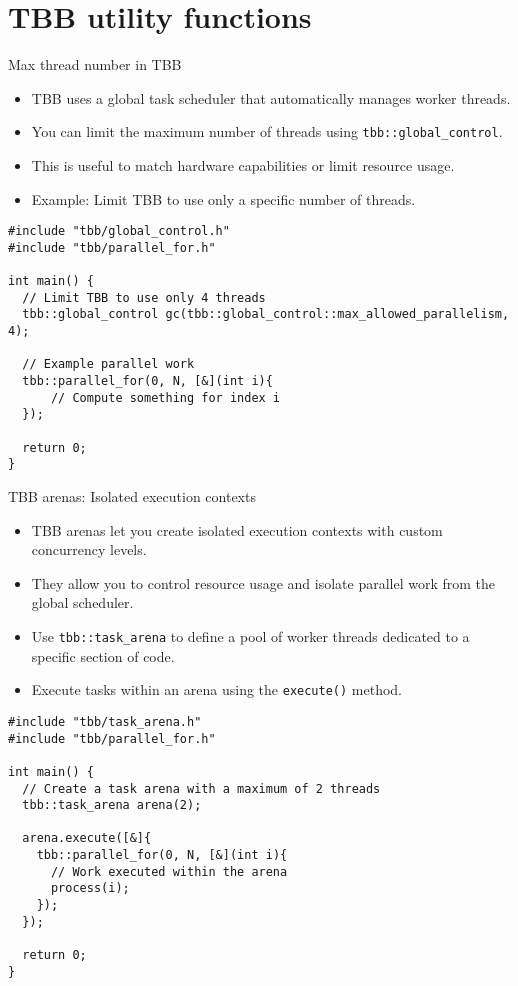 \documentclass{beamer}
\begin{document}
\section{TBB utility functions}

\begin{frame}[fragile]{Max thread number in TBB}
  \begin{itemize}
    \item TBB uses a global task scheduler that automatically manages worker threads.
    \item You can limit the maximum number of threads using \texttt{tbb::global\_control}.
    \item This is useful to match hardware capabilities or limit resource usage.
    \item Example: Limit TBB to use only a specific number of threads.
  \end{itemize}

  \vspace{0.5em}

  \lstset{style=CStyle}
  \begin{lstlisting}
#include "tbb/global_control.h"
#include "tbb/parallel_for.h"

int main() {
  // Limit TBB to use only 4 threads
  tbb::global_control gc(tbb::global_control::max_allowed_parallelism, 4);

  // Example parallel work
  tbb::parallel_for(0, N, [&](int i){
      // Compute something for index i
  });

  return 0;
}
  \end{lstlisting}
\end{frame}

\begin{frame}[fragile]{TBB arenas: Isolated execution contexts}
  \begin{itemize}
    \item TBB arenas let you create isolated execution contexts with custom concurrency levels.
    \item They allow you to control resource usage and isolate parallel work from the global scheduler.
    \item Use \texttt{tbb::task\_arena} to define a pool of worker threads dedicated to a specific section of code.
    \item Execute tasks within an arena using the \texttt{execute()} method.
  \end{itemize}

  \vspace{0.5em}

  \lstset{style=CStyle}
  \begin{lstlisting}
#include "tbb/task_arena.h"
#include "tbb/parallel_for.h"

int main() {
  // Create a task arena with a maximum of 2 threads
  tbb::task_arena arena(2);

  arena.execute([&]{
    tbb::parallel_for(0, N, [&](int i){
      // Work executed within the arena
      process(i);
    });
  });

  return 0;
}
  \end{lstlisting}
\end{frame}
\end{document}
